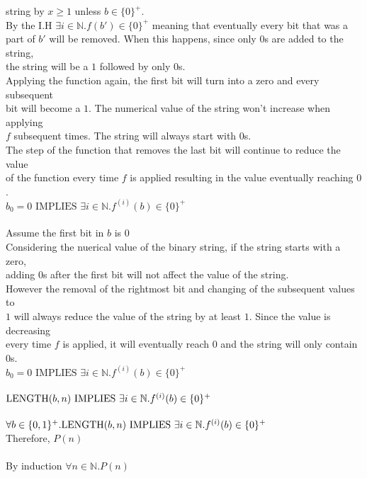 \documentclass[11pt]{article}
\def\nats {{\mathbb N}}
\newcommand{\Implies}{\mbox{ IMPLIES }}
\begin{document}
\begin{enumerate}
\begin{solution}
\null\qquad\qquad string by $x\ge1$ unless $b\in\{0\}^+$. \\
\null\qquad\qquad By the I.H $\exists i\in \nats.f(b')\in\{0\}^+$ meaning that eventually every bit that was a \\
\null\qquad\qquad part of $b'$ will be removed. When this happens, since only $0$s are added to the string,\\
\null\qquad\qquad the string will be a $1$ followed by only $0$s. \\
\null\qquad\qquad Applying the function again, the first bit will turn into a zero and every subsequent\\
\null\qquad\qquad bit will become a $1$. The numerical value of the string won't increase when applying\\
\null\qquad\qquad $f$ subsequent times. The string will always start with $0$s. \\
\null\qquad\qquad The step of the function that removes the last bit will continue to reduce the value\\
\null\qquad\qquad of the function every time $f$ is applied resulting in the value eventually reaching $0$.\\
\null\qquad\quad $b_0= 0 \Implies \exists i\in\nats.f^{(i)}(b)\in\{0\}^+$\\\\
\null\qquad\qquad Assume the first bit in $b$ is $0$\\
\null\qquad\qquad Considering the nuerical value of the binary string, if the string starts with a zero,\\
\null\qquad\qquad adding $0$s after the first bit will not affect the value of the string. \\
\null\qquad\qquad However the  removal of the rightmost bit and changing of the subsequent values to \\
\null\qquad\qquad $1$ will always reduce the value of the string by at least $1$. Since the value is decreasing\\
\null\qquad\qquad every time $f$ is applied, it will eventually reach $0$ and the string will only contain $0$s. \\
\null\qquad\quad $b_0= 0 \Implies \exists i\in\nats.f^{(i)}(b)\in\{0\}^+$\\\\
\null\qquad ${\rm LENGTH}(b,n)\Implies \exists i\in\nats.f^{(i)}(b)\in\{0\}^+$\\\\
\null\quad $\forall b \in\{0,1\}^+.{\rm LENGTH}(b,n)\Implies \exists i\in\nats.f^{(i)}(b)\in\{0\}^+$\\
\null\quad Therefore, $P(n)$ \\\\
By induction $\forall n\in\nats.P(n)$
\\\\


\end{solution}
\end{enumerate}
\end{document}
